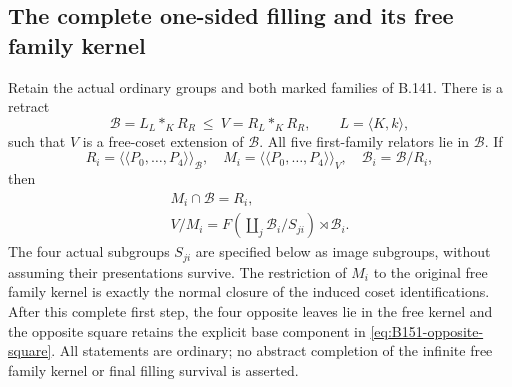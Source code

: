 \subsection*{The complete one-sided filling and its free family kernel}
\label{stmt:B151}
Retain the actual ordinary groups and both marked families of B.141.
There is a retract
\[
 \mathcal B=L_L*_KR_R\ \le\ V=R_L*_KR_R,\qquad
 L=\langle K,k\rangle,
\]
such that \(V\) is a free-coset extension of \(\mathcal B\).
All five first-family relators lie in \(\mathcal B\). If
\[
 R_i=\langle\!\langle P_0,\ldots,P_4\rangle\!\rangle_{\mathcal B},
 \quad M_i=\langle\!\langle P_0,\ldots,P_4\rangle\!\rangle_V,
 \quad \mathcal B_i=\mathcal B/R_i,
\]
then
\begin{equation}\label{eq:B151-main}
\begin{gathered}
 M_i\cap\mathcal B=R_i,\\
 V/M_i=F\left(\coprod_j\mathcal B_i/S_{ji}\right)
                    \rtimes\mathcal B_i.
\end{gathered}
\end{equation}
The four actual subgroups \(S_{ji}\) are specified below as
image subgroups, without assuming their presentations survive.
The restriction of \(M_i\) to the original free family kernel
is exactly the normal closure of the induced coset identifications.
After this complete first step, the four opposite leaves lie
in the free kernel and the opposite square retains the explicit
base component in \eqref{eq:B151-opposite-square}.
All statements are ordinary; no abstract completion of the
infinite free family kernel or final filling survival is asserted.

